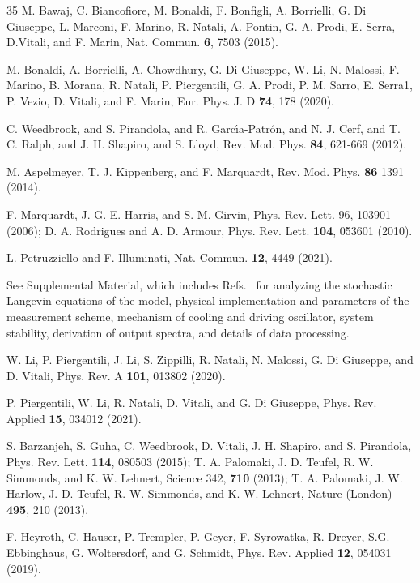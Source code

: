 \documentclass[aps,prl,twocolumn,superscriptaddress]{revtex4-2}
\begin{document}
\begin{thebibliography}{35}
 M. Bawaj, C. Biancofiore, M. Bonaldi, F. Bonfigli, A. Borrielli, G. Di Giuseppe, L. Marconi, F. Marino, R. Natali, A. Pontin, G. A. Prodi, E. Serra, D.Vitali, and F. Marin, Nat. Commun. \textbf{6}, 7503 (2015).

 M. Bonaldi, A. Borrielli, A. Chowdhury, G. Di Giuseppe, W. Li, N. Malossi, F. Marino, B. Morana, R. Natali, P. Piergentili, G. A. Prodi, P. M. Sarro, E. Serra1, P. Vezio, D. Vitali, and F. Marin, Eur. Phys. J. D  \textbf{74}, 178 (2020).

 C. Weedbrook,  and S. Pirandola,  and R. Garc\'{\i}a-Patr\'on, and N. J. Cerf,  and T. C. Ralph,  and J. H. Shapiro,  and S. Lloyd, Rev. Mod. Phys. \textbf{84}, 621-669 (2012).

 M. Aspelmeyer, T. J. Kippenberg, and F. Marquardt, Rev. Mod. Phys. \textbf{86} 1391 (2014).

 F. Marquardt, J. G. E. Harris, and S. M. Girvin, Phys. Rev. Lett. 96, 103901 (2006); D. A. Rodrigues and A. D. Armour, Phys. Rev. Lett. \textbf{104}, 053601 (2010).

 L. Petruzziello and F. Illuminati, Nat. Commun. \textbf{12}, 4449 (2021).

 See Supplemental Material, which includes Refs.~\cite{Weedbrook2012,Li2020,Gorodetksy2010,Mari2009,Piergentili2021,Li2025} for analyzing the stochastic Langevin equations of the model, physical implementation and parameters of the measurement scheme, mechanism of cooling and driving oscillator, system stability, derivation of output spectra, and details of data processing.

 W. Li, P. Piergentili, J. Li, S. Zippilli, R. Natali, N. Malossi, G. Di Giuseppe, and D. Vitali, Phys. Rev. A \textbf{101}, 013802 (2020).

 P. Piergentili, W. Li, R. Natali, D. Vitali, and G. Di Giuseppe, Phys. Rev. Applied \textbf{15}, 034012 (2021).

 S. Barzanjeh, S. Guha, C. Weedbrook, D. Vitali, J. H. Shapiro, and S. Pirandola, Phys. Rev. Lett. \textbf{114}, 080503 (2015); T. A. Palomaki, J. D. Teufel, R. W. Simmonds, and K. W. Lehnert, Science 342, \textbf{710} (2013); T. A. Palomaki, J. W. Harlow, J. D. Teufel, R. W. Simmonds, and K. W. Lehnert, Nature (London) \textbf{495}, 210 (2013).

 F. Heyroth, C. Hauser, P. Trempler, P. Geyer, F. Syrowatka, R. Dreyer, S.G. Ebbinghaus, G. Woltersdorf, and G. Schmidt, Phys. Rev. Applied \textbf{12}, 054031 (2019).


\end{thebibliography}
\end{document}
